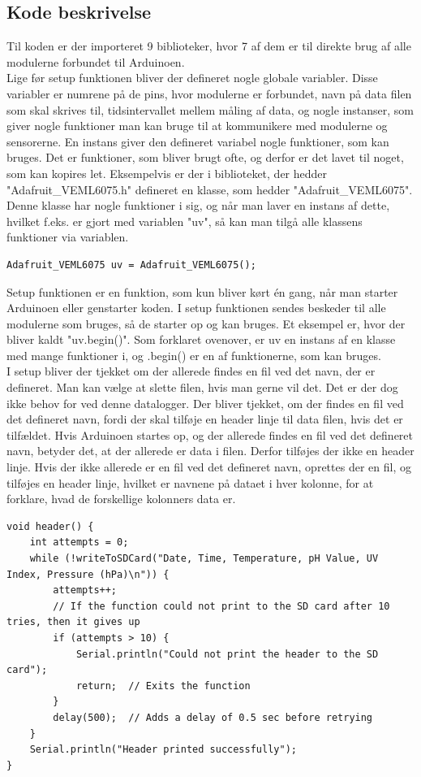 	\subsection{Kode beskrivelse}
		Til koden er der importeret 9 biblioteker, hvor 7 af dem er til direkte brug af alle modulerne forbundet til Arduinoen.\\ [7pt]
		Lige før setup funktionen bliver der defineret nogle globale variabler. Disse variabler er numrene på de pins, hvor modulerne er forbundet, navn på data filen som skal skrives til, tidsintervallet mellem måling af data, og nogle instanser, som giver nogle funktioner man kan bruge til at kommunikere med modulerne og sensorerne. En instans giver den defineret variabel nogle funktioner, som kan bruges. Det er funktioner, som bliver brugt ofte, og derfor er det lavet til noget, som kan kopires let. Eksempelvis er der i biblioteket, der hedder "Adafruit\_VEML6075.h"{} defineret en klasse, som hedder "Adafruit\_VEML6075"{}. Denne klasse har nogle funktioner i sig, og når man laver en instans af dette, hvilket f.eks. er gjort med variablen "uv"{}, så kan man tilgå alle klassens funktioner via variablen.
		\begin{lstlisting}
Adafruit_VEML6075 uv = Adafruit_VEML6075();
		\end{lstlisting}
		\vspace{15pt}
		Setup funktionen er en funktion, som kun bliver kørt én gang, når man starter Arduinoen eller genstarter koden. I setup funktionen sendes beskeder til alle modulerne som bruges, så de starter op og kan bruges. Et eksempel er, hvor der bliver kaldt "uv.begin()". Som forklaret ovenover, er uv en instans af en klasse med mange funktioner i, og .begin() er en af funktionerne, som kan bruges.\\ [5pt]
		I setup bliver der tjekket om der allerede findes en fil ved det navn, der er defineret. Man kan vælge at slette filen, hvis man gerne vil det. Det er der dog ikke behov for ved denne datalogger. Der bliver tjekket, om der findes en fil ved det defineret navn, fordi der skal tilføje en header linje til data filen, hvis det er tilfældet. Hvis Arduinoen startes op, og der allerede findes en fil ved det defineret navn, betyder det, at der allerede er data i filen. Derfor tilføjes der ikke en header linje. Hvis der ikke allerede er en fil ved det defineret navn, oprettes der en fil, og tilføjes en header linje, hvilket er navnene på dataet i hver kolonne, for at forklare, hvad de forskellige kolonners data er.
		\begin{lstlisting}
void header() {
	int attempts = 0;
	while (!writeToSDCard("Date, Time, Temperature, pH Value, UV Index, Pressure (hPa)\n")) {
		attempts++;
		// If the function could not print to the SD card after 10 tries, then it gives up
		if (attempts > 10) {
			Serial.println("Could not print the header to the SD card");
			return;  // Exits the function
		}
		delay(500);  // Adds a delay of 0.5 sec before retrying
	}
	Serial.println("Header printed successfully");
}
		\end{lstlisting}

